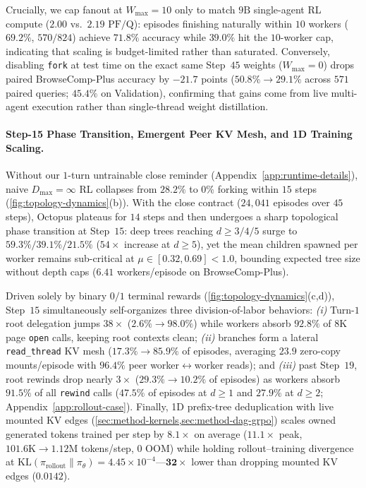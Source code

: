 \documentclass{article}
\begin{document}
Crucially, we cap fanout at $W_{\max}=10$ only to match $9\text{B}$ single-agent RL compute ($2.00$ vs.\ $2.19\text{ PF/Q}$): episodes finishing naturally within $10$ workers ($69.2\%$, $570/824$) achieve $\mathbf{71.8\%}$ accuracy while $39.0\%$ hit the $10$-worker cap, indicating that scaling is budget-limited rather than saturated. Conversely, disabling \texttt{fork} at test time on the exact same Step~$45$ weights ($W_{\max}=0$) drops paired BrowseComp-Plus accuracy by $\mathbf{-21.7}$ points ($50.8\% \to 29.1\%$ across $571$ paired queries; $45.4\%$ on Validation), confirming that gains come from live multi-agent execution rather than single-thread weight distillation.

\paragraph{Step-15 Phase Transition, Emergent Peer KV Mesh, and 1D Training Scaling.}
Without our $1$-turn untrainable close reminder (Appendix~\ref{app:runtime-details}), naive $D_{\max}=\infty$ RL collapses from $28.2\%$ to $0\%$ forking within $15$ steps (\cref{fig:topology-dynamics}(b)). With the close contract ($24{,}041$ episodes over $45$ steps), Octopus plateaus for $14$ steps and then undergoes a sharp topological phase transition at Step~$15$: deep trees reaching $d \ge 3 / 4 / 5$ surge to $\mathbf{59.3\%} / \mathbf{39.1\%} / \mathbf{21.5\%}$ ($54\times$ increase at $d \ge 5$), yet the mean children spawned per worker remains sub-critical at $\mu \in [0.32, 0.69] < 1.0$, bounding expected tree size without depth caps ($6.41$ workers/episode on BrowseComp-Plus).

Driven solely by binary $0/1$ terminal rewards (\cref{fig:topology-dynamics}(c,d)), Step~$15$ simultaneously self-organizes three division-of-labor behaviors: \emph{(i)} Turn-$1$ root delegation jumps $38\times$ ($2.6\% \to \mathbf{98.0\%}$) while workers absorb $\mathbf{92.8\%}$ of $8\text{K}$ page \texttt{open} calls, keeping root contexts clean; \emph{(ii)} branches form a lateral \texttt{read\_thread} KV mesh ($17.3\% \to \mathbf{85.9\%}$ of episodes, averaging $\mathbf{23.9}$ zero-copy mounts/episode with $\mathbf{96.4\%}$ peer worker$\leftrightarrow$worker reads); and \emph{(iii)} past Step~$19$, root rewinds drop nearly $3\times$ ($29.3\% \to 10.2\%$ of episodes) as workers absorb $\mathbf{91.5\%}$ of all \texttt{rewind} calls ($47.5\%$ of episodes at $d \ge 1$ and $27.9\%$ at $d \ge 2$; Appendix~\ref{app:rollout-case}). Finally, 1D prefix-tree deduplication with live mounted KV edges (\cref{sec:method-kernels,sec:method-dag-grpo}) scales owned generated tokens trained per step by $\mathbf{8.1\times}$ on average ($\mathbf{11.1\times}$ peak, $101.6\text{K} \to 1.12\text{M}$ tokens/step, $0$ OOM) while holding rollout--training divergence at $\mathrm{KL}(\pi_{\text{rollout}} \parallel \pi_\theta) = 4.45 \times 10^{-4}$---$\mathbf{32\times}$ lower than dropping mounted KV edges ($0.0142$).
\end{document}
